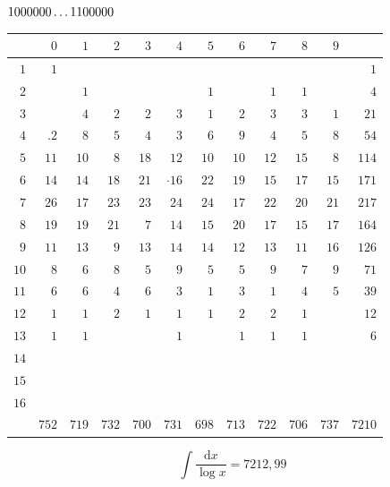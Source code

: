\clearpage
\noindent\begin{minipage}{\linewidth}\centering
{}
\(1000000\mathinner{.\,.\,.}1100000\)\par\smallskip
\begingroup\fontsize{10.5}{11.5}\selectfont\setlength{\tabcolsep}{3.5pt}\renewcommand{\arraystretch}{1}
\begin{tabular}{r|rrrrrrrrrr|r}\hline
 & $0$ & $1$ & $2$ & $3$ & $4$ & $5$ & $6$ & $7$ & $8$ & $9$ &  \\ \hline
$1$ & $1$ &  &  &  &  &  &  &  &  &  & $1$ \\
$2$ &  & $1$ &  &  &  & $1$ &  & $1$ & $1$ &  & $4$ \\
$3$ &  & $4$ & $2$ & $2$ & $3$ & $1$ & $2$ & $3$ & $3$ & $1$ & $21$ \\
$4$ & $\mathord{.}\!2$ & $8$ & $5$ & $4$ & $3$ & $6$ & $9$ & $4$ & $5$ & $8$ & $54$ \\
$5$ & $11$ & $10$ & $8$ & $18$ & $12$ & $10$ & $10$ & $12$ & $15$ & $8$ & $114$ \\
$6$ & $14$ & $14$ & $18$ & $21$ & $\mathord{\cdot}\!16$ & $22$ & $19$ & $15$ & $17$ & $15$ & $171$ \\
$7$ & $26$ & $17$ & $23$ & $23$ & $24$ & $24$ & $17$ & $22$ & $20$ & $21$ & $217$ \\
$8$ & $19$ & $19$ & $21$ & $7$ & $14$ & $15$ & $20$ & $17$ & $15$ & $17$ & $164$ \\
$9$ & $11$ & $13$ & $9$ & $13$ & $14$ & $14$ & $12$ & $13$ & $11$ & $16$ & $126$ \\
$10$ & $8$ & $6$ & $8$ & $5$ & $9$ & $5$ & $5$ & $9$ & $7$ & $9$ & $71$ \\
$11$ & $6$ & $6$ & $4$ & $6$ & $3$ & $1$ & $3$ & $1$ & $4$ & $5$ & $39$ \\
$12$ & $1$ & $1$ & $2$ & $1$ & $1$ & $1$ & $2$ & $2$ & $1$ &  & $12$ \\
$13$ & $1$ & $1$ &  &  & $1$ &  & $1$ & $1$ & $1$ &  & $6$ \\
$14$ &  &  &  &  &  &  &  &  &  &  &  \\
$15$ &  &  &  &  &  &  &  &  &  &  &  \\
$16$ &  &  &  &  &  &  &  &  &  &  &  \\
\hline
 & $752$ & $719$ & $732$ & $700$ & $731$ & $698$ & $713$ & $722$ & $706$ & $737$ & $7210$ \\ \hline
\end{tabular}\par\endgroup
\setlength{\abovedisplayskip}{6pt}\setlength{\belowdisplayskip}{4pt}
\[\int\frac{\mathrm{d}x}{\log x}=7212{,}99\]
\end{minipage}\par

